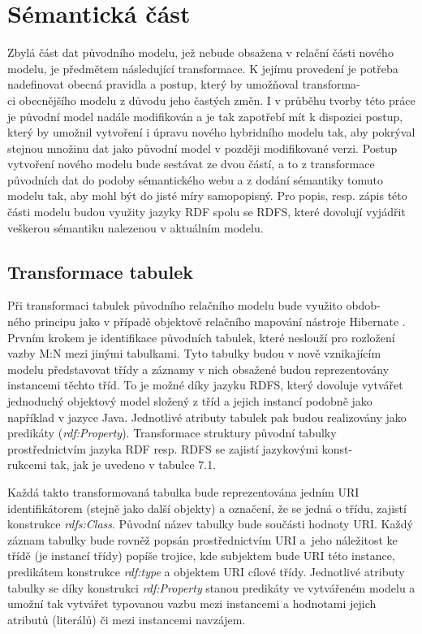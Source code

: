 \documentclass{projekt}
\begin{document}
\section{Sémantická část}
\hspace{0.65cm}Zbylá část dat původního modelu, jež nebude obsažena v relační části nového modelu, je předmětem následující transformace. K jejímu provedení je potřeba nadefinovat obecná pravidla a postup, který by umožňoval transforma-\\ci obecnějšího modelu z důvodu jeho častých změn. I v průběhu tvorby této práce je původní model nadále modifikován a je tak zapotřebí mít k dispozici postup, který by umožnil vytvoření i úpravu nového hybridního modelu tak, aby pokrýval stejnou množinu dat jako původní model v později modifikované verzi. Postup vytvoření nového modelu bude sestávat ze dvou částí, a to z transformace původních dat do podoby sémantického webu a z dodání sémantiky tomuto modelu tak, aby mohl být do jisté míry samopopisný. 
Pro popis, resp. zápis této části modelu budou využity jazyky RDF spolu se RDFS, které dovolují vyjádřit veškerou sémantiku nalezenou v aktuálním modelu.

\subsection{Transformace tabulek}
\hspace{0.65cm}Při transformaci tabulek původního relačního modelu bude využito obdob-\\ného principu jako v případě objektově relačního mapování nástroje Hibernate \cite{_29}. Prvním krokem je identifikace původních tabulek, které neslouží pro rozložení vazby M:N mezi jinými tabulkami. Tyto tabulky budou v nově vznikajícím modelu představovat třídy a záznamy v nich obsažené budou reprezentovány instancemi těchto tříd. To je možné díky jazyku RDFS, který dovoluje vytvářet jednoduchý objektový model složený z tříd a jejich instancí podobně jako například v jazyce Java. Jednotlivé atributy tabulek pak budou realizovány jako predikáty ({\it rdf:Property}). Transformace struktury původní tabulky prostřednictvím jazyka RDF resp. RDFS se zajistí jazykovými konst-\\rukcemi tak, jak je uvedeno v tabulce 7.1.

Každá takto transformovaná tabulka bude reprezentována jedním URI identifikátorem (stejně jako další objekty) a označení, že se jedná o třídu, zajistí konstrukce {\it rdfs:Class}. Původní název tabulky bude součásti hodnoty URI. Každý záznam tabulky bude rovněž popsán prostřednictvím URI a~jeho náležitost ke třídě (je instancí třídy) popíše trojice, kde subjektem bude URI této instance, predikátem konstrukce {\it rdf:type} a objektem URI cílové třídy. Jednotlivé atributy tabulky se díky konstrukci {\it rdf:Property} stanou predikáty ve vytvářeném modelu a umožní tak vytvářet typovanou vazbu mezi instancemi a hodnotami jejich atributů (literálů) či mezi instancemi navzájem. 
\end{document}
